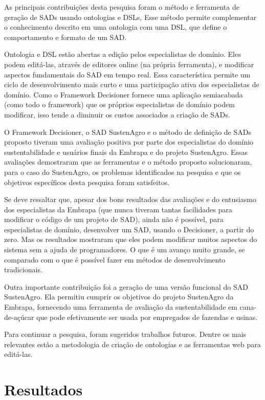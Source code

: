 As principais contribuições desta pesquisa foram o método e ferramenta
de geração de SADs usando ontologias e \foreignlanguage{english}{DSLs},
Esse método permite complementar o conhecimento descrito em uma ontologia
com uma DSL, que define o comportamento e formato de um SAD. 

Ontologia e DSL estão abertas a edição pelos especialistas de domínio.
Eles podem editá-las, através de editores online (na própria ferramenta),
e modificar aspectos fundamentais do SAD em tempo real. Essa característica
permite um ciclo de desenvolvimento mais curto e uma participação
ativa dos especialistas de domínio. Como o Framework Decisioner fornece
uma aplicação semiacabada (como todo o framework) que os próprios
especialistas de domínio podem modificar, isso tende a diminuir os
custos associados a criação de SADs. 

O Framework Decisioner, o SAD SustenAgro e o método de definição de
SADs proposto tiveram uma avaliação positiva por parte dos especialistas
do domínio sustentabilidade e usuários finais da Embrapa e do projeto
SustenAgro. Essas avaliações demostraram que as ferramentas e o método
proposto solucionaram, para o caso do SustenAgro, os problemas identificados
na pesquisa e que os objetivos específicos desta pesquisa foram satisfeitos.

Se deve ressaltar que, apesar dos bons resultados das avaliações e
do entusiasmo dos especialistas da Embrapa (que nunca tiveram tantas
facilidades para modificar o código de um projeto de SAD), ainda não
é possível, para especialistas de domínio, desenvolver um SAD, usando
o Decisioner, a partir do zero. Mas os resultados mostraram que eles
podem modificar muitos aspectos do sistema sem a ajuda de programadores.
O que é um avanço muito grande, se comparado com o que é possível
fazer em métodos de desenvolvimento tradicionais.

Outra importante contribuição foi a geração de uma versão funcional
do SAD SustenAgro. Ela permitiu cumprir os objetivos do projeto SustenAgro
da Embrapa, fornecendo uma ferramenta de avaliação da sustentabilidade
em cana-de-açúcar que pode efetivamente ser usada por empregados de
fazendas e usinas.

Para continuar a pesquisa, foram sugeridos trabalhos futuros. Dentre
os mais relevantes estão a metodologia de criação de ontologias e
as ferramentas web para editá-las.

\section{Resultados}

